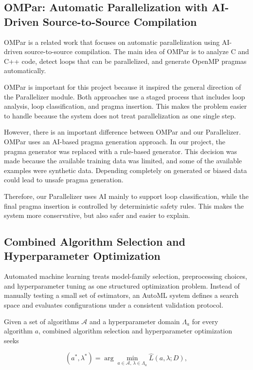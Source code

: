 \documentclass[12pt,a4paper]{report}
\begin{document}
\subsection{OMPar: Automatic Parallelization with AI-Driven Source-to-Source Compilation}
OMPar is a related work that focuses on automatic parallelization using
AI-driven source-to-source compilation. The main idea of OMPar is to analyze C
and C++ code, detect loops that can be parallelized, and generate OpenMP pragmas
automatically.

OMPar is important for this project because it inspired the general direction of
the Parallelizer module. Both approaches use a staged process that includes loop
analysis, loop classification, and pragma insertion. This makes the problem
easier to handle because the system does not treat parallelization as one single
step.

However, there is an important difference between OMPar and our Parallelizer.
OMPar uses an AI-based pragma generation approach. In our project, the pragma
generator was replaced with a rule-based generator. This decision was made
because the available training data was limited, and some of the available
examples were synthetic data. Depending completely on generated or biased data
could lead to unsafe pragma generation.

Therefore, our Parallelizer uses AI mainly to support loop classification, while
the final pragma insertion is controlled by deterministic safety rules. This
makes the system more conservative, but also safer and easier to explain.

\subsection{Combined Algorithm Selection and Hyperparameter Optimization}
Automated machine learning treats model-family selection, preprocessing choices,
and hyperparameter tuning as one structured optimization problem. Instead of
manually testing a small set of estimators, an AutoML system defines a search
space and evaluates configurations under a consistent validation protocol.

Given a set of algorithms $\mathcal{A}$ and a hyperparameter domain
$\Lambda_a$ for every algorithm $a$, combined algorithm selection and
hyperparameter optimization seeks

\begin{equation}
  (a^*, \lambda^*) =
  \arg\min_{a \in \mathcal{A},\,\lambda \in \Lambda_a}
  \widehat{L}(a, \lambda; D),
\end{equation}
\end{document}
